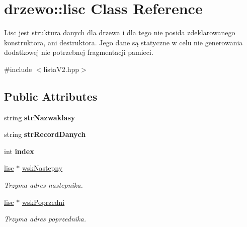 \hypertarget{classdrzewo_1_1lisc}{
\section{drzewo::lisc Class Reference}
\label{classdrzewo_1_1lisc}
}


Lisc jest struktura danych dla drzewa i dla tego nie posida zdeklarowanego konstruktora, ani destruktora. Jego dane są statyczne w celu nie generowania dodatkowej nie potrzebnej fragmentacji pamieci.  


{\ttfamily \#include $<$listaV2.hpp$>$}\subsection*{Public Attributes}
\begin{DoxyCompactItemize}
\item 
\hypertarget{classdrzewo_1_1lisc_a77b67fa8c1f5663d3552eb16dc7762d0}{
string {\bfseries strNazwaklasy}}
\label{classdrzewo_1_1lisc_a77b67fa8c1f5663d3552eb16dc7762d0}

\item 
\hypertarget{classdrzewo_1_1lisc_a60b24e24872b1cf8feb588576fa891aa}{
string {\bfseries strRecordDanych}}
\label{classdrzewo_1_1lisc_a60b24e24872b1cf8feb588576fa891aa}

\item 
\hypertarget{classdrzewo_1_1lisc_ade7f58512dd8be01d6925b14eaf05893}{
int {\bfseries index}}
\label{classdrzewo_1_1lisc_ade7f58512dd8be01d6925b14eaf05893}

\item 
\hypertarget{classdrzewo_1_1lisc_a858c0f3f3ff7295b5cb33f19a1c1f3df}{
\hyperlink{classdrzewo_1_1lisc}{lisc} $\ast$ \hyperlink{classdrzewo_1_1lisc_a858c0f3f3ff7295b5cb33f19a1c1f3df}{wskNastepny}}
\label{classdrzewo_1_1lisc_a858c0f3f3ff7295b5cb33f19a1c1f3df}

\begin{DoxyCompactList}\small\item\em Trzyma adres nastepnika. \item\end{DoxyCompactList}\item 
\hypertarget{classdrzewo_1_1lisc_a1b88c992a7e020e4e753f7a5769e99d3}{
\hyperlink{classdrzewo_1_1lisc}{lisc} $\ast$ \hyperlink{classdrzewo_1_1lisc_a1b88c992a7e020e4e753f7a5769e99d3}{wskPoprzedni}}
\label{classdrzewo_1_1lisc_a1b88c992a7e020e4e753f7a5769e99d3}

\begin{DoxyCompactList}\small\item\em Trzyma adres poprzednika. \item\end{DoxyCompactList}\end{DoxyCompactItemize}



